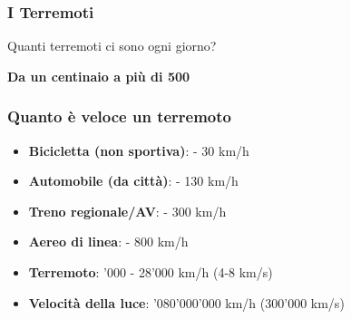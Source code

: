 \begin{frame}
	\frametitle{I Terremoti}
	
	\LARGE Quanti terremoti ci sono ogni giorno?
	\pause
	
	\textbf{Da un centinaio a più di 500}
\end{frame}
\begin{frame}
	\frametitle{Quanto è veloce un terremoto}
		
	\begin{itemize}
		\item \textbf{Bicicletta (non sportiva)}:  - 30 km/h
		\item \textbf{Automobile (da città)}:  - 130 km/h
		\item \textbf{Treno regionale/AV}:  - 300 km/h
		\item \textbf{Aereo di linea}:  - 800 km/h
		\item \textbf{Terremoto}: '000 - 28'000 km/h (4-8 km/s)
		\item \textbf{Velocità della luce}: '080'000'000 km/h (300'000 km/s)
	\end{itemize}	
	
\end{frame}